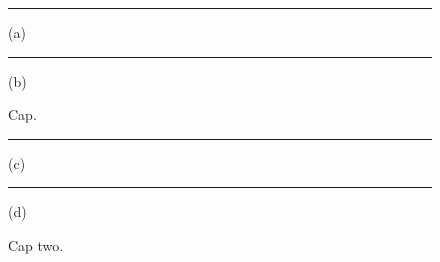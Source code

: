 \documentclass{article}
\def\figsubcap#1{\par\noindent\centering\footnotesize(#1)}
\begin{document}
\begin{figure}[t]
\begin{center}
\hspace*{5pt}\vspace{5pt}
\parbox{2.1in}{\hspace*{-25pt}\rule{200pt}{10pt}\figsubcap{a}}
\hspace*{25pt}
\parbox{2.1in}{\hspace*{-25pt}\rule{200pt}{10pt}\figsubcap{b}}
\caption{Cap.}
\label{ICHEP}
\end{center}
\end{figure}
\begin{figure}[t]
\begin{center}
\hskip 5pt
\parbox{2.1in}{\rule{100pt}{10pt}\figsubcap{c}}
\hspace*{25pt}
\parbox{2.1in}{\rule{100pt}{10pt}\figsubcap{d}}
\caption{Cap two.}
\end{center}
\end{figure}
\end{document}
